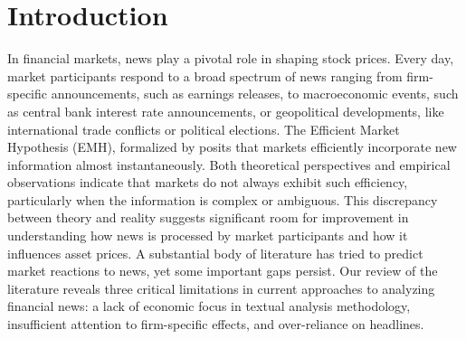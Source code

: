 \section{Introduction}
In financial markets, news play a pivotal role in shaping stock prices. Every day, market participants respond to a broad spectrum of news ranging from firm-specific announcements, such as earnings releases, to macroeconomic events, such as central bank interest rate announcements, or geopolitical developments, like international trade conflicts or political elections. The Efficient Market Hypothesis (EMH), formalized by 
\cite{fama1970efficient} %
posits that markets efficiently incorporate new information almost instantaneously. Both theoretical perspectives and empirical observations indicate that markets do not always exhibit such efficiency, particularly when the information is complex or ambiguous. This discrepancy between theory and reality suggests significant room for improvement in understanding how news is processed by market participants and how it influences asset prices.
%
A substantial body of literature has tried to predict market reactions to news, yet some important gaps persist. Our review of the literature reveals three critical limitations in current approaches to analyzing financial news: a lack of economic focus in textual analysis methodology, insufficient attention to firm-specific effects, and over-reliance on headlines.

